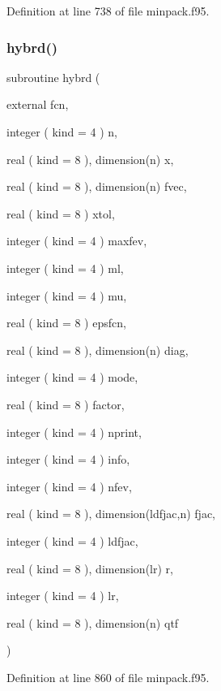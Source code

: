 Definition at line 738 of file minpack.\+f95.

\mbox{\label{minpack_8f95_a1e525d0d69e43bfda5f82e3bc4745b2f}} 
\subsubsection{\texorpdfstring{hybrd()}{hybrd()}}
{\footnotesize\ttfamily subroutine hybrd (\begin{DoxyParamCaption}\item[{external}]{fcn,  }\item[{integer ( kind = 4 )}]{n,  }\item[{real ( kind = 8 ), dimension(n)}]{x,  }\item[{real ( kind = 8 ), dimension(n)}]{fvec,  }\item[{real ( kind = 8 )}]{xtol,  }\item[{integer ( kind = 4 )}]{maxfev,  }\item[{integer ( kind = 4 )}]{ml,  }\item[{integer ( kind = 4 )}]{mu,  }\item[{real ( kind = 8 )}]{epsfcn,  }\item[{real ( kind = 8 ), dimension(n)}]{diag,  }\item[{integer ( kind = 4 )}]{mode,  }\item[{real ( kind = 8 )}]{factor,  }\item[{integer ( kind = 4 )}]{nprint,  }\item[{integer ( kind = 4 )}]{info,  }\item[{integer ( kind = 4 )}]{nfev,  }\item[{real ( kind = 8 ), dimension(ldfjac,n)}]{fjac,  }\item[{integer ( kind = 4 )}]{ldfjac,  }\item[{real ( kind = 8 ), dimension(lr)}]{r,  }\item[{integer ( kind = 4 )}]{lr,  }\item[{real ( kind = 8 ), dimension(n)}]{qtf }\end{DoxyParamCaption})}



Definition at line 860 of file minpack.\+f95.

